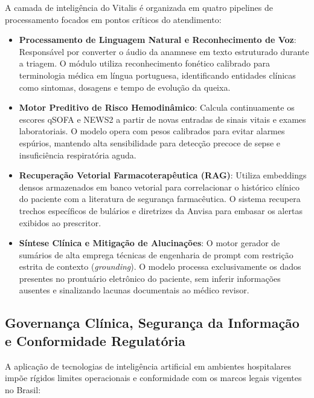 A camada de inteligência do Vitalis é organizada em quatro pipelines de processamento focados em pontos críticos do atendimento:

\begin{itemize}
    \item \textbf{Processamento de Linguagem Natural e Reconhecimento de Voz}: Responsável por converter o áudio da anamnese em texto estruturado durante a triagem. O módulo utiliza reconhecimento fonético calibrado para terminologia médica em língua portuguesa, identificando entidades clínicas como sintomas, dosagens e tempo de evolução da queixa.
    \item \textbf{Motor Preditivo de Risco Hemodinâmico}: Calcula continuamente os escores qSOFA e NEWS2 a partir de novas entradas de sinais vitais e exames laboratoriais. O modelo opera com pesos calibrados para evitar alarmes espúrios, mantendo alta sensibilidade para detecção precoce de sepse e insuficiência respiratória aguda.
    \item \textbf{Recuperação Vetorial Farmacoterapêutica (RAG)}: Utiliza embeddings densos armazenados em banco vetorial para correlacionar o histórico clínico do paciente com a literatura de segurança farmacêutica. O sistema recupera trechos específicos de bulários e diretrizes da Anvisa para embasar os alertas exibidos ao prescritor.
    \item \textbf{Síntese Clínica e Mitigação de Alucinações}: O motor gerador de sumários de alta emprega técnicas de engenharia de prompt com restrição estrita de contexto (\textit{grounding}). O modelo processa exclusivamente os dados presentes no prontuário eletrônico do paciente, sem inferir informações ausentes e sinalizando lacunas documentais ao médico revisor.
\end{itemize}

\subsection{Governança Clínica, Segurança da Informação e Conformidade Regulatória}
\label{subsec:governanca_conformidade}

A aplicação de tecnologias de inteligência artificial em ambientes hospitalares impõe rígidos limites operacionais e conformidade com os marcos legais vigentes no Brasil:

